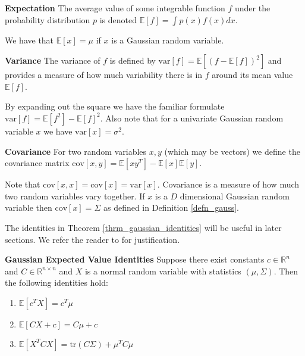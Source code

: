 \begin{defn}
\textbf{Expectation} The average value of some integrable function $f$ under the probability distribution $p$ is denoted $\mathbb{E}[f] = \int p(x)f(x)dx$.
\label{def_expectation}
\end{defn}
We have that $\mathbb{E}[x]=\mu$ if $x$ is a Gaussian random variable.
\begin{defn}
\textbf{Variance} The variance of $f$ is defined by $\text{var}[f] = \mathbb{E}[(f - \mathbb{E}[f])^2]$ and provides a measure of how much variability there is in $f$ around its mean value $\mathbb{E}[f]$.
\label{def_variance}
\end{defn}
By expanding out the square we have the familiar formulate $\text{var}[f] = \mathbb{E}[f^2] - \mathbb{E}[f]^2$. Also note that for a  univariate Gaussian random variable $x$ we have $\text{var}[x] =\sigma^2$.
\begin{defn}
\textbf{Covariance} For two random variables $x,y$ (which may be vectors) we define the covariance matrix $\text{cov}[x,y] = \mathbb{E}[xy^T] - \mathbb{E}[x]\mathbb{E}[y]$.
\label{def_covariance}
\end{defn}
Note that $\text{cov}[x,x]=\text{cov}[x]=\text{var}[x]$. Covariance is a measure of how much two random variables vary together. If $x$ is a $D$ dimensional Gaussian random variable then $\text{cov}[x] = \Sigma$ as defined in Definition \ref{defn_gauss}.

The identities in Theorem \ref{thrm_gaussian_identities} will be useful in later sections. We refer the reader to \cite{davidian} for justification.
\begin{thrm}
\textbf{Gaussian Expected Value Identities}
Suppose there exist constants $c \in \mathbb{R}^n$ and $C \in \mathbb{R}^{n \times n}$ and $X$ is a normal random variable with statistics $(\mu, \Sigma)$. Then the following identities hold:
\begin{enumerate}
\item
$\mathbb{E}[c^TX] = c^T\mu$
\item
$\mathbb{E}[CX+c] = C\mu + c$
\item
$\mathbb{E}[X^TCX] = \text{tr}(C\Sigma) + \mu^TC\mu$
\end{enumerate}
\label{thrm_gaussian_identities}
\end{thrm}  

